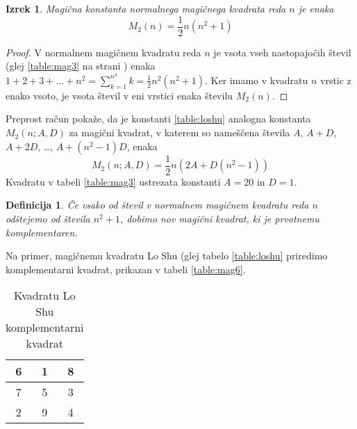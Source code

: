\documentclass[a4paper,12pt]{article}
\newtheorem{definition}{Definicija}
\newtheorem{theorem}{Izrek}[section]
\begin{document}
\begin{theorem}
   Magična konstanta normalnega magičnega kvadrata reda $n$
   je enaka
   \begin{equation}
      M_2(n) = \frac{1}{2} n(n^2+1)
   \end{equation}
\end{theorem}

\begin{proof}
   V normalnem magičnem kvadratu reda $n$ je vsota vseh nastopajočih
   števil (glej \ref{table:mag3} na strani \pageref{table:mag3}) enaka
   $1+2+3+\dots+n^2=\sum_{k=1}^{n^2}k=\frac{1}{2}n^2(n^2+1)$. Ker imamo
   v kvadratu $n$ vrstic z enako vsoto, je vsota števil v eni vrstici
   enaka številu $M_2(n)$. %
   
\end{proof}

Preprost račun pokaže, da je konstanti \ref{table:loshu} analogna konstanta
$M_2(n;A,D)$ za magični kvadrat, v katerem so nameščena števila
$A$, $A+D$, $A+2D$, \dots, $A+(n^2-1)D$, enaka %
\begin{equation}
   M_2(n;A,D) = \frac{1}{2}n (2A + D(n^2-1))
\end{equation}
Kvadratu v tabeli \ref{table:mag3} ustrezata konstanti $A=20$ in $D=1$.

\begin{definition}

      Če vsako od števil v normalnem magičnem kvadratu reda $n$ odštejemo
      od števila $n^2+1$, dobimo nov magični kvadrat, ki je prvotnemu
      \emph{komplementaren}.
\end{definition}

Na primer, magičnemu kvadratu Lo Shu (glej tabelo \ref{table:loshu} priredimo
komplementarni kvadrat, prikazan v tabeli \ref{table:mag6}.

\begin{table}[!ht]
   \centering
   \caption{Kvadratu Lo Shu komplementarni kvadrat}
   \label{table:closhu}
   \begin{tabular}{|c|c|c|}
      \hline
      6 & 1 & 8 \\
      \hline
      7 & 5 & 3 \\
      \hline
      2 & 9 & 4 \\
      \hline
    
      \hline

      
   \end{tabular}
   
\end{table}
%
\end{document}

